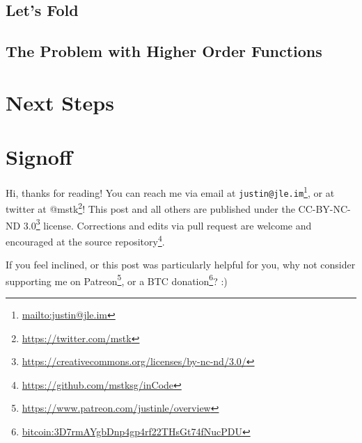 \documentclass[]{article}
\renewcommand{\href}[2]{#2\footnote{\url{#1}}}
\begin{document}
\hypertarget{lets-fold}{%
\subsection{Let's Fold}\label{lets-fold}}

\hypertarget{the-problem-with-higher-order-functions}{%
\subsection{The Problem with Higher Order
Functions}\label{the-problem-with-higher-order-functions}}

\hypertarget{next-steps}{%
\section{Next Steps}\label{next-steps}}

\hypertarget{signoff}{%
\section{Signoff}\label{signoff}}

Hi, thanks for reading! You can reach me via email at
\href{mailto:justin@jle.im}{\nolinkurl{justin@jle.im}}, or at twitter at
\href{https://twitter.com/mstk}{@mstk}! This post and all others are published
under the \href{https://creativecommons.org/licenses/by-nc-nd/3.0/}{CC-BY-NC-ND
3.0} license. Corrections and edits via pull request are welcome and encouraged
at \href{https://github.com/mstksg/inCode}{the source repository}.

If you feel inclined, or this post was particularly helpful for you, why not
consider \href{https://www.patreon.com/justinle/overview}{supporting me on
Patreon}, or a \href{bitcoin:3D7rmAYgbDnp4gp4rf22THsGt74fNucPDU}{BTC donation}?
:)
\end{document}
